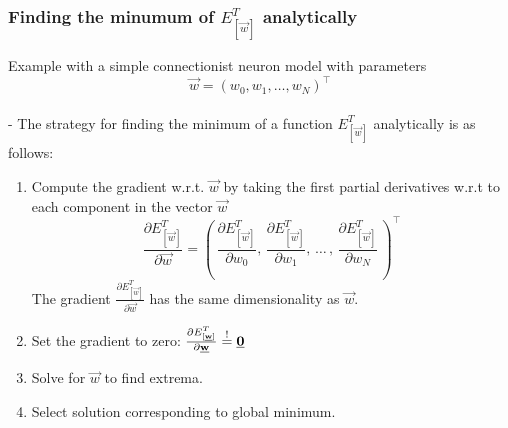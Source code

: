 \begin{frame}\frametitle{Finding the minumum of $E_{[\vec{w}]}^T$ analytically}

    Example with a simple connectionist neuron model
    with parameters
    $$\vec w = (w_{0}, w_{1}, \ldots, w_{N})^{\top}$$\\


    - The strategy for finding the minimum of a function $E_{[\vec{w}]}^T$ analytically is as follows:
    \begin{enumerate}
    \item Compute the gradient w.r.t. $\vec w$ by taking the first partial derivatives w.r.t to each component in the vector $\vec w$
    \begin{equation}
        \frac{\partial E_{[\vec{w}]}^T}{\partial \vec w} = \left(\,
        \frac{\partial E_{[\vec{w}]}^T}{\partial w_{0}}, \,
        \frac{\partial E_{[\vec{w}]}^T}{\partial w_{1}}, \,\ldots\,,\, 
        \frac{\partial E_{[\vec{w}]}^T}{\partial w_{N}}\,
        \right)^{\top}
        \label{eq:gradient_partial}
    \end{equation}
    The gradient $\frac{\partial E_{[\vec{w}]}^T}{\partial \vec w}$ has the same dimensionality as $\vec w$.
    
    \item Set the gradient to zero: $\frac{\partial E_{[\underline{\mathbf{w}}]}^T}{\partial \underline{\mathbf{w}}} \stackrel{\mathrm{!}}{=} \underline{\mathbf{0}}$
    \item Solve for $\vec w$ to find extrema.
    \item Select solution corresponding to global minimum.
    
    \end{enumerate}
\end{frame}


